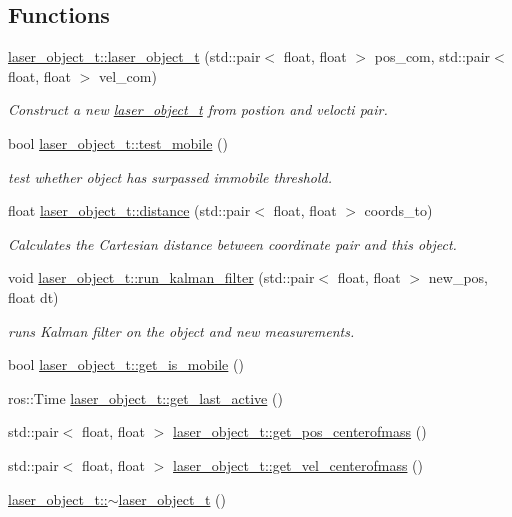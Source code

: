 \subsection*{Functions}
\begin{DoxyCompactItemize}
\item 
\hyperlink{group__laser__object__t_ga86fb4dc51298aedc38f4dea202e86d94}{laser\+\_\+object\+\_\+t\+::laser\+\_\+object\+\_\+t} (std\+::pair$<$ float, float $>$ pos\+\_\+com, std\+::pair$<$ float, float $>$ vel\+\_\+com)
\begin{DoxyCompactList}\small\item\em Construct a new \hyperlink{classlaser__object__t}{laser\+\_\+object\+\_\+t} from postion and velocti pair. \end{DoxyCompactList}\item 
bool \hyperlink{group__laser__object__t_gaaf5e27005d394ba00082e17a0804f3b2}{laser\+\_\+object\+\_\+t\+::test\+\_\+mobile} ()
\begin{DoxyCompactList}\small\item\em test whether object has surpassed immobile threshold. \end{DoxyCompactList}\item 
float \hyperlink{group__laser__object__t_ga1306580c845a8e9e37646988d86788c0}{laser\+\_\+object\+\_\+t\+::distance} (std\+::pair$<$ float, float $>$ coords\+\_\+to)
\begin{DoxyCompactList}\small\item\em Calculates the Cartesian distance between coordinate pair and this object. \end{DoxyCompactList}\item 
void \hyperlink{group__laser__object__t_ga7197f41117174159f618bbdcd63f9cc3}{laser\+\_\+object\+\_\+t\+::run\+\_\+kalman\+\_\+filter} (std\+::pair$<$ float, float $>$ new\+\_\+pos, float dt)
\begin{DoxyCompactList}\small\item\em runs Kalman filter on the object and new measurements. \end{DoxyCompactList}\item 
bool \hyperlink{group__laser__object__t_ga5aba73083c62b017d1e09d9e36a35df1}{laser\+\_\+object\+\_\+t\+::get\+\_\+is\+\_\+mobile} ()
\item 
ros\+::\+Time \hyperlink{group__laser__object__t_ga85ea7644afff4ac0315156a182946110}{laser\+\_\+object\+\_\+t\+::get\+\_\+last\+\_\+active} ()
\item 
std\+::pair$<$ float, float $>$ \hyperlink{group__laser__object__t_ga02a018369ba1e52d2cec3625f7452c7b}{laser\+\_\+object\+\_\+t\+::get\+\_\+pos\+\_\+centerofmass} ()
\item 
std\+::pair$<$ float, float $>$ \hyperlink{group__laser__object__t_gadfafd151af0900623901d162260ba234}{laser\+\_\+object\+\_\+t\+::get\+\_\+vel\+\_\+centerofmass} ()
\item 
\hyperlink{group__laser__object__t_gac9cc27a949e2af39dc4da7fb0fb8f8d4}{laser\+\_\+object\+\_\+t\+::$\sim$laser\+\_\+object\+\_\+t} ()\hypertarget{group__laser__object__t_gac9cc27a949e2af39dc4da7fb0fb8f8d4}{}\label{group__laser__object__t_gac9cc27a949e2af39dc4da7fb0fb8f8d4}


\end{DoxyCompactItemize}
